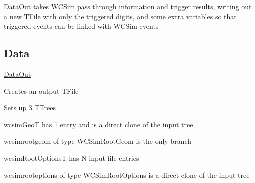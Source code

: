 \hyperlink{classDataOut}{Data\-Out} takes W\-C\-Sim pass through information and trigger results, writing out a new T\-File with only the triggered digits, and some extra variables so that triggered events can be linked with W\-C\-Sim events

\subsection*{Data}

\hyperlink{classDataOut}{Data\-Out}
\begin{DoxyItemize}
\item Creates an output {\ttfamily T\-File}
\item Sets up 3 T\-Trees
\begin{DoxyEnumerate}
\item {\ttfamily wcsim\-Geo\-T} has 1 entry and is a direct clone of the input tree

{\ttfamily wcsimrootgeom} of type {\ttfamily W\-C\-Sim\-Root\-Geom} is the only branch
\item {\ttfamily wcsim\-Root\-Options\-T} has N input file entries

{\ttfamily wcsimrootoptions} of type {\ttfamily W\-C\-Sim\-Root\-Options} is a direct clone of the input tree


\end{DoxyEnumerate}
\end{DoxyItemize}
